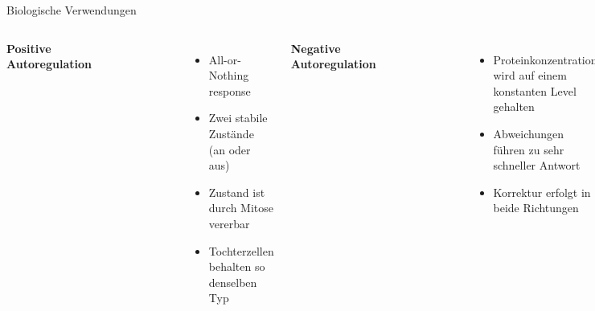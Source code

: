 \documentclass[11pt,aspectratio=169,reqno]{beamer}
\begin{document}
\begin{frame}{Biologische Verwendungen}
    \begin{columns}
        \centering
        \textbf{Positive Autoregulation}
        \begin{figure}
            \includegraphics[width=.6\textwidth]{images/dna_positive_autoregulation.png}
        \end{figure}

        \begin{itemize}
            \item All-or-Nothing response
            \item Zwei stabile Zustände (an oder aus)
            \item Zustand ist durch Mitose vererbar
            \item Tochterzellen behalten so denselben Typ
        \end{itemize}
        
        \centering
        \textbf{Negative Autoregulation}
        \begin{figure}
            \includegraphics[width=.6\textwidth]{images/dna_negative_autoregulation.png}
        \end{figure}

        \begin{itemize}
            \item Proteinkonzentration wird auf einem konstanten Level gehalten
            \item Abweichungen führen zu sehr schneller Antwort
            \item Korrektur erfolgt in beide Richtungen 
        \end{itemize}
    \end{columns}
\end{frame}
\end{document}
